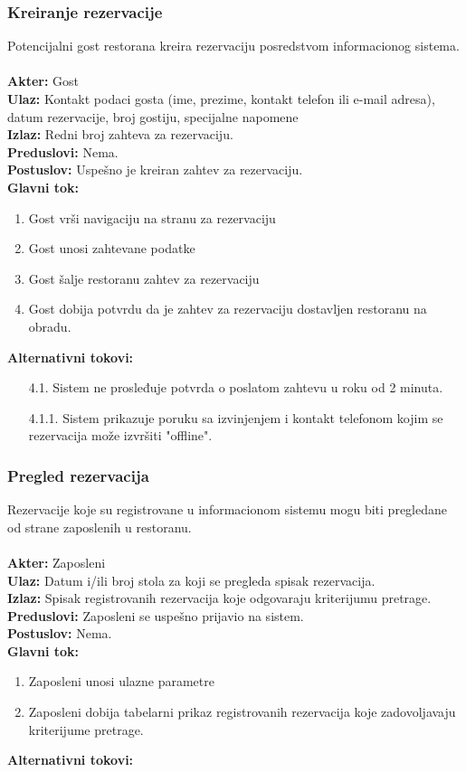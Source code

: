 \documentclass{article}
\begin{document}
\subsubsection{Kreiranje rezervacije}
Potencijalni gost restorana kreira rezervaciju posredstvom informacionog sistema.\\\\
\textbf{Akter:} Gost\\
\textbf{Ulaz:} Kontakt podaci gosta (ime, prezime, kontakt telefon ili e-mail adresa), datum rezervacije, broj gostiju, specijalne napomene\\
\textbf{Izlaz:} Redni broj zahteva za rezervaciju.\\
\textbf{Preduslovi:} Nema.\\
\textbf{Postuslov:} Uspešno je kreiran zahtev za rezervaciju.\\
\textbf{Glavni tok:}
\begin{enumerate}
\item Gost vrši navigaciju na stranu za rezervaciju
\item Gost unosi zahtevane podatke
\item Gost šalje restoranu zahtev za rezervaciju
\item Gost dobija potvrdu da je zahtev za rezervaciju dostavljen restoranu na obradu.\\
\end{enumerate}
\textbf{Alternativni tokovi:}\\
\begin{itemize}
\item [4.1.] Sistem ne prosleđuje potvrda o poslatom zahtevu u roku od 2 minuta.
\item [4.1.1.] Sistem prikazuje poruku sa izvinjenjem i kontakt telefonom kojim se rezervacija može izvršiti "offline".
\end{itemize}

\subsubsection{Pregled rezervacija}
Rezervacije koje su registrovane u informacionom sistemu mogu biti pregledane od strane zaposlenih u restoranu.\\\\
\textbf{Akter:} Zaposleni\\
\textbf{Ulaz:} Datum i/ili broj stola za koji se pregleda spisak rezervacija.\\
\textbf{Izlaz:} Spisak registrovanih rezervacija koje odgovaraju kriterijumu pretrage.\\
\textbf{Preduslovi:} Zaposleni se uspešno prijavio na sistem.\\
\textbf{Postuslov:} Nema.\\
\textbf{Glavni tok:}
\begin{enumerate}
\item Zaposleni unosi ulazne parametre
\item Zaposleni dobija tabelarni prikaz registrovanih rezervacija koje zadovoljavaju kriterijume pretrage.\\
\end{enumerate}
\textbf{Alternativni tokovi:} \ \\
\end{document}
